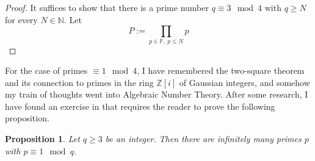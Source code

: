 \documentclass{scrartcl}
\newcommand{\primes}{\mathbb{P}}
\newcommand{\N}{\mathbb{N}}
\newcommand{\Z}{\mathbb{Z}}
\newtheorem{proposition}[definition]{Proposition}
\begin{document}
\begin{proof}
    It suffices to show that there is a prime number $q \equiv 3 \mod 4$ with $q \geq N$ for every $N \in \N$.
    Let
    \begin{equation*}
        P := \prod_{p \in \primes, \ p \leq N} p
    \end{equation*}
\end{proof}
For the case of primes $\equiv 1 \mod 4$, I have remembered the two-square theorem and its connection to primes in the ring $\Z[i]$ of Gaussian integers, and somehow my train of thoughts went into Algebraic Number Theory.
After some research, I have found an exercise in \cite[Chapter I, §10]{neukirch} that requires the reader to prove the following proposition.
\begin{proposition}
    Let $q \geq 3$ be an integer.
    Then there are infinitely many primes $p$ with $p \equiv 1 \mod q$.
\end{proposition}
\end{document}

